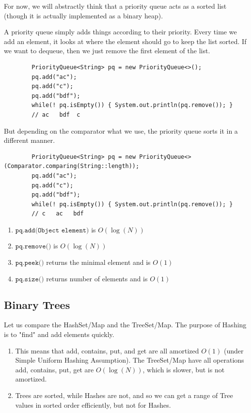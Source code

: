 \documentclass{article}
\begin{document}
    For now, we will abstractly think that a priority queue acts as a sorted list (though it is actually implemented as a binary heap). 

    \begin{definition}
    A priority queue simply adds things according to their priority. Every time we add an element, it looks at where the element should go to keep the list sorted. If we want to dequeue, then we just remove the first element of the list. 
    \begin{lstlisting}
        PriorityQueue<String> pq = new PriorityQueue<>();
        pq.add("ac"); 
        pq.add("c"); 
        pq.add("bdf"); 
        while(! pq.isEmpty()) { System.out.println(pq.remove()); }
        // ac   bdf  c
    \end{lstlisting}
    But depending on the comparator what we use, the priority queue sorts it in a different manner. 
    \begin{lstlisting}
        PriorityQueue<String> pq = new PriorityQueue<>(Comparator.comparing(String::length)); 
        pq.add("ac"); 
        pq.add("c"); 
        pq.add("bdf"); 
        while(! pq.isEmpty()) { System.out.println(pq.remove()); }
        // c   ac   bdf
    \end{lstlisting}
    \begin{enumerate}
        \item $\texttt{pq.add(Object element)}$ is $O(\log(N))$
        \item $\texttt{pq.remove()}$ is $O(\log(N))$ 
        \item $\texttt{pq.peek()}$ returns the minimal element and is $O(1)$
        \item $\texttt{pq.size()}$ returns number of elements and is $O(1)$
    \end{enumerate}
    \end{definition}

  \subsection{Binary Trees}

      Let us compare the HashSet/Map and the TreeSet/Map. The purpose of Hashing is to "find" and add elements quickly. 
      \begin{enumerate}
          \item This means that add, contains, put, and get are all amortized $O(1)$ (under Simple Uniform Hashing Assumption). The TreeSet/Map have all operations add, contains, put, get are $O(\log(N))$, which is slower, but is not amortized. 
          \item Trees are sorted, while Hashes are not, and so we can get a range of Tree values in sorted order efficiently, but not for Hashes. 
      \end{enumerate}
\end{document}
